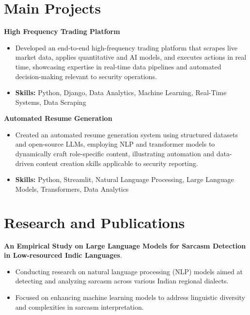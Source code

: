 \documentclass[a4paper,11pt]{article}
\begin{document}
\section{\textbf{Main Projects}}

\vspace{1mm}
  \textbf{High Frequency Trading Platform  }
\vspace{-1.5mm} %
\begin{itemize}
  \item Developed an end-to-end high-frequency trading platform that scrapes live market data, applies quantitative and AI models, and executes actions in real time, showcasing expertise in real-time data pipelines and automated decision-making relevant to security operations.
\vspace{-3mm}
  \item \textbf{Skills:} Python, Django, Data Analytics, Machine Learning, Real-Time Systems, Data Scraping
\end{itemize}


\vspace{1mm}
   \textbf{Automated Resume Generation }
\vspace{-1.5mm} %
\begin{itemize}
  \item Created an automated resume generation system using structured datasets and open-source LLMs, employing NLP and transformer models to dynamically craft role-specific content, illustrating automation and data-driven content creation skills applicable to security reporting.
\vspace{-3mm}
  \item \textbf{Skills:} Python, Streamlit, Natural Language Processing, Large Language Models, Transformers, Data Analytics
\end{itemize}



\section{\textbf{Research and Publications} \hfill }
\vspace{1mm}
  \textbf{An Empirical Study on Large Language Models for Sarcasm Detection in Low-resourced Indic Languages}.
\vspace{-1mm} %
\begin{itemize}
  \item Conducting research on natural language processing (NLP) models aimed at detecting and analyzing sarcasm across various Indian regional dialects.
\vspace{-3mm}
  \item Focused on enhancing machine learning models to address linguistic diversity and complexities in sarcasm interpretation.
\end{itemize}
\end{document}
